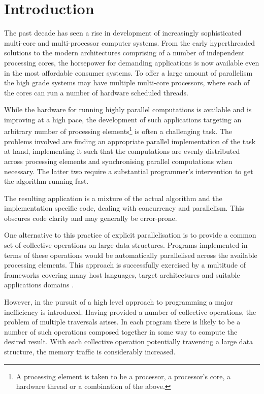 \documentclass[preamble.tex]{subfiles}
\begin{document}
\clearpage

\chapter{Introduction}
\label{ch:introduction}

The past decade has seen a rise in development of increasingly sophisticated multi-core and multi-processor computer systems. From the early hyperthreaded solutions to the modern architectures comprising of a number of independent processing cores, the horsepower for demanding applications is now available even in the most affordable consumer systems. To offer a large amount of parallelism the high grade systems may have multiple multi-core processors, where each of the cores can run a number of hardware scheduled threads.

While the hardware for running highly parallel computations is available and is improving at a high pace, the development of such applications targeting an arbitrary number of processing elements\ipe{}\footnote{A processing element is taken to be a processor, a processor's core, a hardware thread or a combination of the above.} is often a challenging task. The problems involved are finding an appropriate parallel implementation of the task at hand, implementing it such that the computations are evenly distributed across processing elements and synchronising parallel computations when necessary. The latter two require a substantial programmer's intervention to get the algorithm running fast.


The resulting application is a mixture of the actual algorithm and the implementation specific code, dealing with concurrency and parallelism. This obscures code clarity and may generally be error-prone.

One alternative to this practice of explicit parallelisation is to provide a common set of collective operations\icollop{} on large data structures. Programs implemented in terms of these operations would be automatically parallelised across the available processing elements. This approach is successfully exercised by a multitude of frameworks covering many host languages, target architectures and suitable applications domains \cite{PLKC08,KCL+10,CKL+11,AS07}.

However, in the pursuit of a high level approach to programming a major inefficiency is introduced. Having provided a number of collective operations, the problem of multiple traversals arises. In each program there is likely to be a number of such operations composed together in some way to compute the desired result. With each collective operation potentially traversing a large data structure, the memory traffic is considerably increased.
\end{document}
